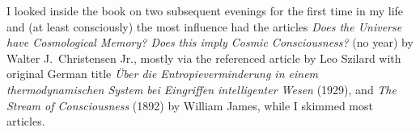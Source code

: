 \vspace{9mm}
\noindent
{\footnotesize
\raisebox{0.1ex}{\smaller*} I looked inside the book on two subsequent evenings for the first time in my life
and (at least consciously) the most influence had the articles
\textsl{Does the Universe have Cosmological Memory? Does this imply Cosmic Consciousness?} (no year)
by Walter J.~Christensen Jr.,
mostly via the referenced article by Leo Szilard with original German title
\textsl{Über die Entropieverminderung in einem thermodynamischen System bei Eingriffen intelligenter Wesen} (1929),
and $\!$\textsl{The Stream of Consciousness} (1892) by William James,
while I skimmed most articles.
\par}


